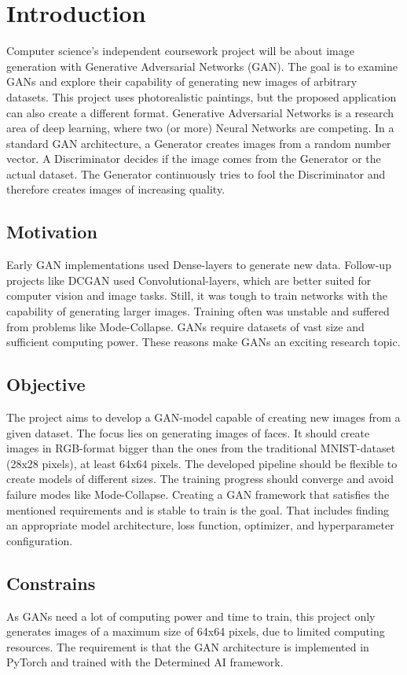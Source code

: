 \section{Introduction}

Computer science's independent coursework project will be about image generation with Generative Adversarial Networks (GAN). The goal is to examine GANs and explore their capability of generating new images of arbitrary datasets. This project uses photorealistic paintings, but the proposed application can also create a different format. Generative Adversarial Networks is a research area of deep learning, where two (or more) Neural Networks are competing. In a standard GAN architecture, a Generator creates images from a random number vector. A Discriminator decides if the image comes from the Generator or the actual dataset. The Generator continuously tries to fool the Discriminator and therefore creates images of increasing quality.


\subsection{Motivation}

Early GAN implementations used Dense-layers to generate new data. Follow-up projects like DCGAN used Convolutional-layers, which are better suited for computer vision and image tasks. Still, it was tough to train networks with the capability of generating larger images. Training often was unstable and suffered from problems like Mode-Collapse. GANs require datasets of vast size and sufficient computing power. These reasons make GANs an exciting research topic.

\subsection{Objective}

The project aims to develop a GAN-model capable of creating new images from a given dataset. The focus lies on generating images of faces. It should create images in RGB-format bigger than the ones from the traditional MNIST-dataset (28x28 pixels), at least 64x64 pixels. The developed pipeline should be flexible to create models of different sizes. The training progress should converge and avoid failure modes like Mode-Collapse. Creating a GAN framework that satisfies the mentioned requirements and is stable to train is the goal. That includes finding an appropriate model architecture, loss function, optimizer, and hyperparameter configuration. 


\subsection{Constrains}

As GANs need a lot of computing power and time to train, this project only generates images of a maximum size of 64x64 pixels, due to limited computing resources. The requirement is that the GAN architecture is implemented in PyTorch and trained with the Determined AI framework.